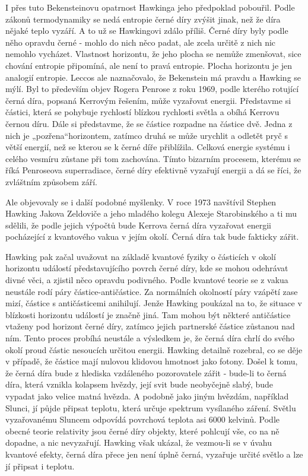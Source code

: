   I přes tuto Bekensteinovu opatrnost Hawkinga jeho předpoklad pobouřil. Podle zákonů termodynamiky
  se nedá entropie černé díry zvýšit jinak, než že díra nějaké teplo vyzáří. A to už se Hawkingovi
  zdálo příliš. Černé díry byly podle něho opravdu černé - mohlo do nich něco padat, ale zcela
  určitě z nich nic nemohlo vycházet. Vlastnost horizontu, že jeho plocha se nemůže zmenšovat, sice
  chování entropie připomíná, ale není to pravá entropie. Plocha horizontu je jen analogií entropie.
  Leccos ale naznačovalo, že Bekenstein má pravdu a Hawking se mýlí. Byl to především objev Rogera
  Penrose z roku 1969, podle kterého rotující černá díra, popsaná Kerrovým řešením, může vyzařovat
  energii. Představme si částici, která se pohybuje rychlostí blízkou rychlosti světla a obíhá
  Kerrovu černou díru. Dále si představme, že se částice rozpadne na částice dvě. Jedna z nich je
  „pozřena“horizontem, zatímco druhá se může urychlit a odletět pryč s větší energií, než se kterou
  se k černé díře přiblížila. Celková energie systému i celého vesmíru zůstane při tom zachována.
  Tímto bizarním procesem, kterému se říká Penroseova superradiace, černé díry efektivně vyzařují
  energii a dá se říci, že zvláštním způsobem září. 
  
  Ale objevovaly se i další podobné myšlenky. V roce 1973 navštívil Stephen Hawking Jakova Zeldoviče
  a jeho mladého kolegu Alexeje Starobinského a ti mu sdělili, že podle jejich výpočtů bude Kerrova
  černá díra vyzařovat energii pocházející z kvantového vakua v jejím okolí. Černá díra tak bude
  fakticky zářit. 
  
  Hawking pak začal uvažovat na základě kvantové fyziky o částicích v okolí horizontu událostí
  představujícího povrch černé díry, kde se mohou odehrávat divné věci, a zjistil něco opravdu
  podivného. Podle kvantové teorie se z vakua neustále rodí páry částice-antičástice. Za normálních
  okolností páry vzápětí zase mizí, částice s antičásticemi anihilují. Jenže Hawking poukázal na to,
  že situace v blízkosti horizontu událostí je značně jiná. Tam mohou být některé antičástice
  vtaženy pod horizont černé díry, zatímco jejich partnerské částice zůstanou nad ním. Tento proces
  probíhá neustále a výsledkem je, že černá díra chrlí do svého okolí proud částic nesoucích určitou
  energii. Hawking detailně rozebral, co se děje v případě, že částice mají nulovou klidovou
  hmotnost jako fotony. Došel k tomu, že černá díra bude z hlediska vzdáleného pozorovatele zářit -
  bude-li to černá díra, která vznikla kolapsem hvězdy, její svit bude neobyčejně slabý, bude
  vypadat jako velice matná hvězda. A podobně jako jiným hvězdám, například Slunci, jí půjde připsat
  teplotu, která určuje spektrum vysílaného záření. Světlu vyzařovanému Sluncem odpovídá povrchová
  teplota asi 6000 kelvinů. Podle obecné teorie relativity jsou černé díry objekty, které pohlcují
  vše, co na ně dopadne, a nic nevyzařují. Hawking však ukázal, že vezmou-li se v úvahu kvantové
  efekty, černá díra přece jen není úplně černá, vyzařuje určité světlo a lze jí připsat i teplotu.
  
